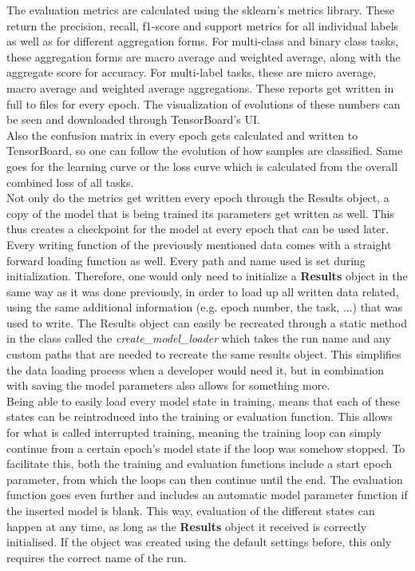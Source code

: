 The evaluation metrics are calculated using the sklearn's metrics library. These return the precision, recall, f1-score and support metrics for all individual labels as well as for different aggregation forms. For multi-class and binary class tasks, these aggregation forms are macro average and weighted average, along with the aggregate score for accuracy. For multi-label tasks, these are micro average, macro average and weighted average aggregations. These reports get written in full to files for every epoch. The visualization of evolutions of these numbers can be seen and downloaded through TensorBoard's UI. \\

Also the confusion matrix in every epoch gets calculated and written to TensorBoard, so one can follow the evolution of how samples are classified. Same goes for the learning curve or the loss curve which is calculated from the overall combined loss of all tasks. \\

Not only do the metrics get written every epoch through the Results object, a copy of the model that is being trained its parameters get written as well. This thus creates a checkpoint for the model at every epoch that can be used later. Every writing function of the previously mentioned data comes with a straight forward loading function as well. Every path and name used is set during initialization. Therefore, one would only need to initialize a \textbf{Results} object in the same way as it was done previously, in order to load up all written data related, using the same additional information (e.g. epoch number, the task, ...) that was used to write. The Results object can easily be recreated through a static method in the class called the \textit{create\_model\_loader} which takes the run name and any custom paths that are needed to recreate the same results object. This simplifies the data loading process when a developer would need it, but in combination with saving the model parameters also allows for something more. \\

Being able to easily load every model state in training, means that each of these states can be reintroduced into the training or evaluation function. This allows for what is called interrupted training, meaning the training loop can simply continue from a certain epoch's model state if the loop was somehow stopped. To facilitate this, both the training and evaluation functions include a start epoch parameter, from which the loops can then continue until the end. The evaluation function goes even further and includes an automatic model parameter function if the inserted model is blank. This way, evaluation of the different states can happen at any time, as long as the \textbf{Results} object it received is correctly initialised. If the object was created using the default settings before, this only requires the correct name of the run. \\

